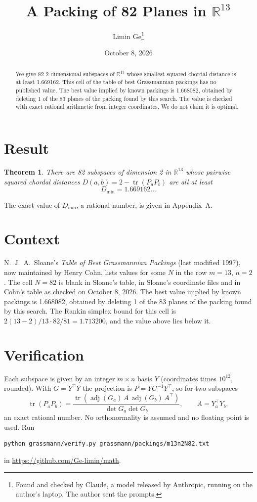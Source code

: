 \documentclass[11pt,a4paper]{article}
\title{A Packing of 82 Planes in $\mathbb{R}^{13}$}
\author{Limin Ge\thanks{Found and checked by Claude, a model released by Anthropic, running on the author's laptop. The author sent the prompts.}}
\date{October 8, 2026}
\newtheorem*{theorem}{Theorem}
\begin{document}
\maketitle
\begin{abstract}
We give 82 2-dimensional subspaces of $\mathbb{R}^{13}$ whose smallest squared chordal distance is at least 1.669162. This cell of the table of best Grassmannian packings has no published value. The best value implied by known packings is 1.668082, obtained by deleting 1 of the 83 planes of the packing found by this search. The value is checked with exact rational arithmetic from integer coordinates. We do not claim it is optimal.
\end{abstract}

\section{Result}
\begin{theorem}
There are 82 subspaces of dimension 2 in $\mathbb{R}^{13}$ whose pairwise squared chordal distances $D(a,b) = 2 - \operatorname{tr}(P_aP_b)$ are all at least
\[ D_{\min} = 1.669162\ldots \]
\end{theorem}
The exact value of $D_{\min}$, a rational number, is given in Appendix~A.


\section{Context}
N.~J.~A.~Sloane's \emph{Table of Best Grassmannian Packings} (last modified 1997), now maintained by Henry Cohn, lists values for some $N$ in the row $m=13$, $n=2$. The cell $N=82$ is blank in Sloane's table, in Sloane's coordinate files and in Cohn's table as checked on October 8, 2026. The best value implied by known packings is 1.668082, obtained by deleting 1 of the 83 planes of the packing found by this search. The Rankin simplex bound for this cell is $2(13-2)/13\cdot 82/81 = 1.713200$, and the value above lies below it.


\section{Verification}
Each subspace is given by an integer $m\times n$ basis $Y$ (coordinates times $10^{12}$, rounded). With $G=Y^\top Y$ the projection is $P=YG^{-1}Y^\top$, so for two subspaces
\[ \operatorname{tr}(P_aP_b)=\frac{\operatorname{tr}(\operatorname{adj}(G_a)\,A\,\operatorname{adj}(G_b)\,A^\top)}{\det G_a\det G_b},\qquad A=Y_a^\top Y_b, \]
an exact rational number. No orthonormality is assumed and no floating point is used. Run
\begin{verbatim}
python grassmann/verify.py grassmann/packings/m13n2N82.txt
\end{verbatim}
in \url{https://github.com/Ge-limin/math}.
\end{document}
